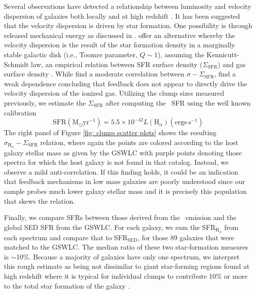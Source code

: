 Several observations have detected a relationship between luminosity and velocity dispersion of galaxies both locally and at high redshift \citep{Dib2006,Green2010,Lehnert2009,Genzel2011}. It has been suggested that the velocity dispersion is driven by star formation. One possibility is through released mechanical energy as discussed in \cite{Lehnert2009}. \cite{Wisnioski2012} offer an alternative whereby the velocity dispersion is the result of the star formation density in a marginally stable galactic disk (i.e., Toomre parameter, $Q\sim1$), assuming the Kennicutt-Schmidt law, an empirical relation between SFR surface density ($\Sigma_{\mathrm{SFR}}$) and gas surface density \citep{Schmidt1959,Kennicutt1998a}. While \cite{Wisnioski2012} find a moderate correlation between $\sigma-\Sigma_{\mathrm{SFR}}$, \cite{Genzel2011} find a weak dependence concluding that feedback does not appear to directly drive the velocity dispersion of the ionized gas.  Utilizing the clump sizes measured previously, we estimate the $\Sigma_{\mathrm{SFR}}$ after computing the \ha~SFR using the well known calibration \citep{Kennicutt1998,Calzetti2013}
\begin{equation}
\mathrm{SFR} (\mathrm{M}_{\odot} \mathrm{yr}^{-1}) = 5.5 \times 10^{-42}L(\mathrm{H}_{\alpha}) (\mathrm{ergs\ s}^{-1})
\end{equation}
The right panel of Figure \ref{fig: clump scatter plots} shows the resulting $\sigma_{\mathrm{H}_{\alpha}}-\Sigma_{\mathrm{SFR}}$ relation, where again the points are colored according to the host galaxy stellar mass as given by the GSWLC with purple points denoting those spectra for which the host galaxy is not found in that catalog. Instead, we observe a mild anti-correlation. If this finding holds, it could be an indication that feedback mechanisms in low mass galaxies are poorly understood since our sample probes much lower galaxy stellar mass and it is precisely this population that skews the relation. 


Finally, we compare SFRs between those derived from the \ha~emission and the global SED SFR from the GSWLC. For each galaxy, we sum the SFR$_{\mathrm{H}_{\alpha}}$ from each spectrum and compare that to SFR$_{\mathrm{SED}}$, for those 89 galaxies that were matched to the GSWLC. The median ratio of these two star-formation measures is $\sim$10\%. Because a majority of galaxies have only one spectrum, we interpret this rough estimate as being not dissimilar to giant star-forming regions found at high redshift where it is typical for individual clumps to contribute 10\% or more to the total star formation of the galaxy \citep{Genzel2011, Guo2012, Wisnioski2012}.


